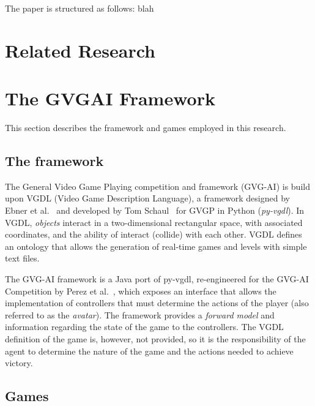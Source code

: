 \documentclass[conference]{IEEEtran}
\begin{document}
The paper is structured as follows: blah
 
\section{Related Research} \label{sec:lit}




\section{The GVGAI Framework} \label{sec:framework}

This section describes the framework and games employed in this research.


\subsection{The framework} \label{ssec:framework}

The General Video Game Playing competition and framework (GVG-AI) is build upon VGDL (Video Game Description Language), a framework designed by Ebner et al.~\cite{Ebner2013} and developed by Tom Schaul~\cite{schaul2013pyvgdl} for GVGP in Python (\textit{py-vgdl}). In VGDL, \textit{objects} interact in a two-dimensional rectangular space, with associated coordinates, and the ability of interact (collide) with each other. VGDL defines an ontology that allows the generation of real-time games and levels with simple text files.

The GVG-AI framework is a Java port of py-vgdl, re-engineered for the GVG-AI Competition by Perez et al.~\cite{Perez2015}, which exposes an interface that allows the implementation of controllers that must determine the actions of the player (also referred to as the \textit{avatar}). The framework provides a \textit{forward model} and information regarding the state of the game to the controllers. The VGDL definition of the game is, however, not provided, so it is the responsibility of the agent to determine the nature of the game and the actions needed to achieve victory. 


\subsection{Games} \label{ssec:games}
\end{document}

